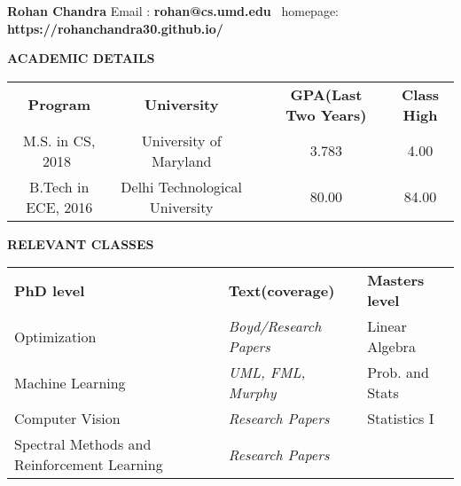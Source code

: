 \documentclass[a4paper,8pt]{article}
\newcommand{\resheading}[1]{\begin{tcolorbox} \begin{center} #1 \end{center} \end{tcolorbox}}
\begin{document}

\textbf{\large{Rohan Chandra}} 
\indent Email : \textbf{rohan@cs.umd.edu}  \ homepage: \textbf{https://rohanchandra30.github.io/}\\

\resheading{\textbf{ACADEMIC DETAILS} }
\indent \begin{tabular}{ c @{\hskip 1in} c @{\hskip 1in} c @{\hskip .5in} c @{\hskip .5in} c @{\hskip 0.4in} }
\textbf{Program} & \multicolumn{1}{c}{\textbf{University}} &  & \textbf{GPA(\small{Last Two Years})} & \textbf{Class High}\\
M.S. in CS, 2018\,\, & \multicolumn{1}{c}{University of Maryland} & & {3.783} & {4.00}\\
B.Tech in ECE, 2016 & \multicolumn{1}{c}{Delhi Technological University} & & {80.00} & {84.00}\\
\end{tabular}


\resheading{\textbf{RELEVANT CLASSES} }
\indent \begin{tabular}{ l @{\hskip 1.1in} l @{\hskip 1.1in} l @{\hskip 1.1in}  }
\textbf{PhD level} & \textbf{Text(coverage)} & \textbf{Masters level}   \\
Optimization & \textit{Boyd/Research Papers} & Linear Algebra  \\
Machine Learning & \textit{UML, FML, Murphy} & Prob. and Stats  \\
Computer Vision & \textit{Research Papers} &  Statistics I\\
Spectral Methods and Reinforcement Learning & \textit{Research Papers}
\end{tabular}
\end{document}
